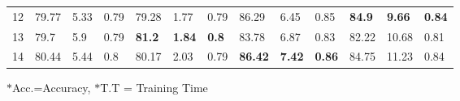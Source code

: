 \begin{table}
{\begin{tabular}{@{}cllllllllllll@{}}
			12                               & 79.77          & 5.33           & 0.79     & 79.28      & 1.77      & 0.79 & 86.29      & 6.45      & 0.85 & \textbf{84.9}       & \textbf{9.66}      & \textbf{0.84} \\
			13                               & 79.7           & 5.9            & 0.79     & \textbf{81.2}       & \textbf{1.84}      & \textbf{0.8}  & 83.78      & 6.87      & 0.83 & 82.22      & 10.68     & 0.81 \\
			14                               & 80.44          & 5.44           & 0.8      & 80.17      & 2.03      & 0.79 & \textbf{86.42}      & \textbf{7.42}      & \textbf{0.86} & 84.75      & 11.23     & 0.84 \\
			\bottomrule[1.25pt]
	\end{tabular}}
	\vspace{0.5ex}
	\raggedright $\ast$Acc.=Accuracy, $\ast$T.T = Training Time
\end{table}


